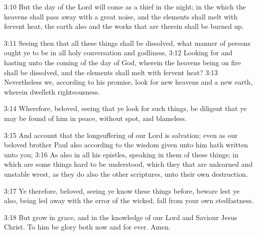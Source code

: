 3:10 But the day of the Lord will come as a thief in the night; in the
which the heavens shall pass away with a great noise, and the elements
shall melt with fervent heat, the earth also and the works that are
therein shall be burned up.

3:11 Seeing then that all these things shall be dissolved, what manner
of persons ought ye to be in all holy conversation and godliness, 3:12
Looking for and hasting unto the coming of the day of God, wherein the
heavens being on fire shall be dissolved, and the elements shall melt
with fervent heat?  3:13 Nevertheless we, according to his promise,
look for new heavens and a new earth, wherein dwelleth righteousness.

3:14 Wherefore, beloved, seeing that ye look for such things, be
diligent that ye may be found of him in peace, without spot, and
blameless.

3:15 And account that the longsuffering of our Lord is salvation; even
as our beloved brother Paul also according to the wisdom given unto
him hath written unto you; 3:16 As also in all his epistles, speaking
in them of these things; in which are some things hard to be
understood, which they that are unlearned and unstable wrest, as they
do also the other scriptures, unto their own destruction.

3:17 Ye therefore, beloved, seeing ye know these things before, beware
lest ye also, being led away with the error of the wicked, fall from
your own stedfastness.

3:18 But grow in grace, and in the knowledge of our Lord and Saviour
Jesus Christ. To him be glory both now and for ever. Amen.

